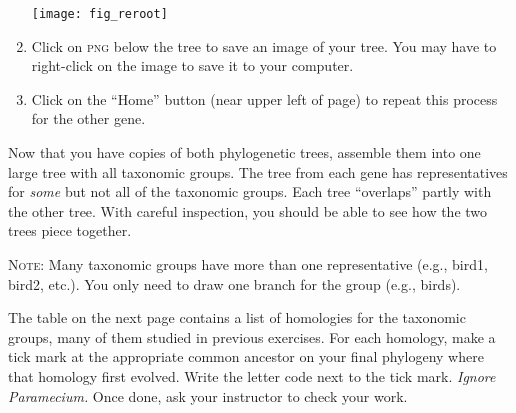 \documentclass[12pt, hidelinks]{exam}
\begin{document}
\begin{enumerate}
\begin{center}
	\texttt{[image: fig\_reroot]}
\end{center}
	
	\item Click on \textsc{png} below the tree to save an image of your tree. You may have to right-click on the image to save it to your computer.

	\item Click on the “Home” button (near upper left of page) to repeat this process for the other gene.


\end{enumerate}

	
	
	

\begin{questions}

\question
Now that you have copies of both phylogenetic trees, assemble them into one large tree with all taxonomic groups. The tree from each gene has representatives for \emph{some} but not all of the taxonomic groups. Each tree “overlaps” partly with the other tree. With careful inspection, you should be able to see how the two trees piece together. 

\textsc{Note:} Many taxonomic groups have more than one representative (e.g., bird1, bird2, etc.). You only need to draw one branch for the group (e.g., birds).

\question[Checkout]
The table on the next page contains a list of homologies for the taxonomic groups, many of them studied in previous exercises. For each homology, make a tick mark at the appropriate common ancestor on your final phylogeny where that homology first evolved. Write the letter code next to the tick mark. \textit{Ignore Paramecium.} Once done, ask your instructor to check your work.

\end{questions}

\newpage

\thispagestyle{empty}
\end{document}
